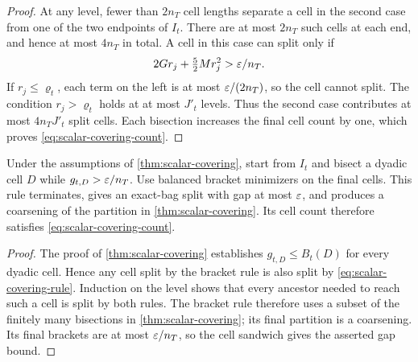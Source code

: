 \begin{proof}
At any level, fewer than $2n_T$ cell lengths separate a cell in the
second case from one of the two endpoints of $I_t$.
There are at most $2n_T$ such cells at each end, and hence at most $4n_T$
in total.  A cell in this case can split only if
\[
 2G r_j+\tfrac52 M r_j^2>\varepsilon/n_T.
\]
If $r_j\leq\varrho_t$, each term on the left is at most
$\varepsilon/(2n_T)$, so the cell cannot split.
The condition $r_j>\varrho_t$ holds at at most $J'_t$ levels.
Thus the second case contributes at most $4n_T J'_t$ split cells.
Each bisection increases the final cell count by one, which proves
\eqref{eq:scalar-covering-count}.
\end{proof}

\begin{corollary}
\label{cor:scalar-covering-bracket}
Under the assumptions of \cref{thm:scalar-covering}, start from $I_t$
and bisect a dyadic cell $D$ while $g_{t,D}>\varepsilon/n_T$.
Use balanced bracket minimizers on the final cells.
This rule terminates, gives an exact-bag split with gap at most $\varepsilon$,
and produces a coarsening of the partition in
\cref{thm:scalar-covering}.  Its cell count therefore satisfies
\eqref{eq:scalar-covering-count}.
\end{corollary}

\begin{proof}
The proof of \cref{thm:scalar-covering} establishes
$g_{t,D}\leq B_t(D)$ for every dyadic cell.  Hence any cell split by the
bracket rule is also split by \eqref{eq:scalar-covering-rule}.
Induction on the level shows that every ancestor needed to reach such
a cell is split by both rules.  The bracket rule therefore uses a
subset of the finitely many bisections in
\cref{thm:scalar-covering}; its final partition is a coarsening.
Its final brackets are at most $\varepsilon/n_T$, so the cell sandwich gives
the asserted gap bound.
\end{proof}
